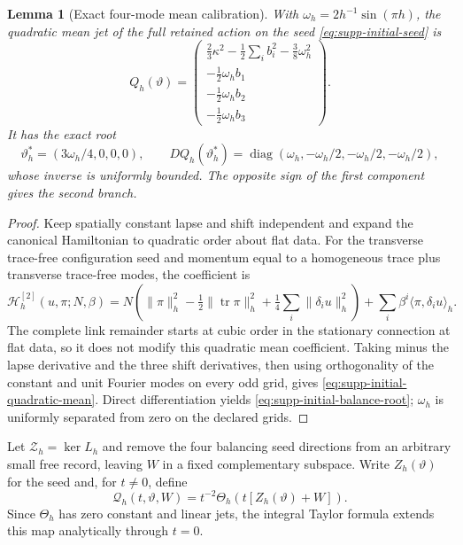 \documentclass[11pt]{article}
\numberwithin{equation}{section}
\newtheorem{lemma}[lemma]{Lemma}
\theoremstyle{definition}
\theoremstyle{remark}
\newcommand{\tr}{\operatorname{tr}}
\begin{document}
\begin{lemma}[Exact four-mode mean calibration]
\label{lem:supp-initial-balance}
With $\omega_h=2h^{-1}\sin(\pi h)$, the quadratic mean jet of the full
retained action on the seed \eqref{eq:supp-initial-seed} is
\begin{equation}
 Q_h(\vartheta)=
 \begin{pmatrix}
 \frac23\kappa^2-\frac12\sum_i b_i^2-\frac38\omega_h^2\\
 -\frac12\omega_hb_1\\-\frac12\omega_hb_2\\-\frac12\omega_hb_3
 \end{pmatrix}.
 \label{eq:supp-initial-quadratic-mean}
\end{equation}
It has the exact root
\begin{equation}
 \vartheta_h^*=(3\omega_h/4,0,0,0),
 \qquad
 DQ_h(\vartheta_h^*)=
 \operatorname{diag}(\omega_h,-\omega_h/2,-\omega_h/2,-\omega_h/2),
 \label{eq:supp-initial-balance-root}
\end{equation}
whose inverse is uniformly bounded.  The opposite sign of the first component
gives the second branch.
\end{lemma}
\begin{proof}
Keep spatially constant lapse and shift independent and expand the canonical
Hamiltonian to quadratic order about flat data.  For the transverse trace-free
configuration seed and momentum equal to a homogeneous trace plus transverse
trace-free modes, the coefficient is
\[
 \mathscr H_h^{[2]}(u,\pi;N,\beta)=
 N\left(\|\pi\|_h^2-\tfrac12\|\tr\pi\|_h^2
          +\tfrac14\sum_i\|\delta_i u\|_h^2\right)
 +\sum_i\beta^i\langle\pi,\delta_i u\rangle_h.
\]
The complete link remainder starts at cubic order in the stationary connection
at flat data, so it does not modify this quadratic mean coefficient.  Taking
minus the lapse derivative and the three shift derivatives, then using
orthogonality of the constant and unit Fourier modes on every odd grid, gives
\eqref{eq:supp-initial-quadratic-mean}.  Direct differentiation yields
\eqref{eq:supp-initial-balance-root}; $\omega_h$ is uniformly separated from
zero on the declared grids.
\end{proof}

Let $\mathcal Z_h=\ker L_h$ and remove the four balancing seed directions
from an arbitrary small free record, leaving $W$ in a fixed complementary
subspace.  Write $Z_h(\vartheta)$ for the seed and, for $t\ne0$, define
\begin{equation}
 \mathcal Q_h(t,\vartheta,W)=t^{-2}\Theta_h(t[Z_h(\vartheta)+W]).
 \label{eq:supp-initial-normalized-mean}
\end{equation}
Since $\Theta_h$ has zero constant and linear jets, the integral Taylor formula
extends this map analytically through $t=0$.
\end{document}
